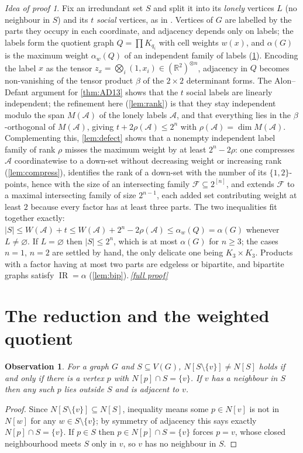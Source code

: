 \documentclass[11pt,a4paper]{article}
\theoremstyle{plain}
\newtheorem{observation}[theorem]{Observation}
\theoremstyle{definition}
\theoremstyle{remark}
\newtheorem*{proofidea}{Idea of proof}
\newcommand{\fullproofref}[1]{\,\hyperref[#1]{\textit{[full proof]}}}
\newcommand{\R}{\mathbb R}
\newcommand{\IR}{\operatorname{IR}}
\newcommand{\cA}{\mathcal A}
\newcommand{\cF}{\mathcal F}
\newcommand{\rk}{\rho}
\newcommand{\alw}{\alpha_w}
\begin{document}
\begin{proofidea}
Fix an irredundant set $S$ and split it into its \emph{lonely} vertices $L$ (no neighbour in $S$) and its $t$ \emph{social} vertices, as in \cite{AD20}. Vertices of $G$ are labelled by the parts they occupy in each coordinate, and adjacency depends only on labels; the labels form the quotient graph $Q=\prod K_{q_i}$ with cell weights $w(x)$, and $\alpha(G)$ is the maximum weight $\alw(Q)$ of an independent family of labels (\cref{sec:quotient}). Encoding the label $x$ as the tensor $z_x=\bigotimes_i(1,x_i)\in(\R^2)^{\otimes n}$, adjacency in $Q$ becomes non-vanishing of the tensor product $\beta$ of the $2\times2$ determinant forms. The Alon--Defant argument for \cref{thm:AD13} shows that the $t$ social labels are linearly independent; the refinement here (\cref{lem:rank}) is that they stay independent modulo the span $M(\cA)$ of the lonely labels $\cA$, and that everything lies in the $\beta$-orthogonal of $M(\cA)$, giving $t+2\rk(\cA)\le2^n$ with $\rk(\cA)=\dim M(\cA)$. Complementing this, \cref{lem:defect} shows that a nonempty independent label family of rank $\rk$ misses the maximum weight by at least $2^n-2\rk$: one compresses $\cA$ coordinatewise to a down-set without decreasing weight or increasing rank (\cref{lem:compress}), identifies the rank of a down-set with the number of its $\{1,2\}$-points, hence with the size of an intersecting family $\cF\subseteq2^{[n]}$, and extends $\cF$ to a maximal intersecting family of size $2^{n-1}$, each added set contributing weight at least $2$ because every factor has at least three parts. The two inequalities fit together exactly: $|S|\le W(\cA)+t\le W(\cA)+2^n-2\rk(\cA)\le\alw(Q)=\alpha(G)$ whenever $L\ne\varnothing$. If $L=\varnothing$ then $|S|\le2^n$, which is at most $\alpha(G)$ for $n\ge3$; the cases $n=1$, $n=2$ are settled by hand, the only delicate one being $K_3\times K_3$. Products with a factor having at most two parts are edgeless or bipartite, and bipartite graphs satisfy $\IR=\alpha$ (\cref{lem:bip}).\fullproofref{pf:main}
\end{proofidea}

\section{The reduction and the weighted quotient}\label{sec:quotient}

\begin{observation}\label{obs:irred}
For a graph $G$ and $S\subseteq V(G)$, $N[S\setminus\{v\}]\ne N[S]$ holds if and only if there is a vertex $p$ with $N[p]\cap S=\{v\}$. If $v$ has a neighbour in $S$ then any such $p$ lies outside $S$ and is adjacent to $v$.
\end{observation}
\begin{proof}
Since $N[S\setminus\{v\}]\subseteq N[S]$, inequality means some $p\in N[v]$ is not in $N[w]$ for any $w\in S\setminus\{v\}$; by symmetry of adjacency this says exactly $N[p]\cap S=\{v\}$. If $p\in S$ then $p\in N[p]\cap S=\{v\}$ forces $p=v$, whose closed neighbourhood meets $S$ only in $v$, so $v$ has no neighbour in $S$.
\end{proof}
\end{document}
